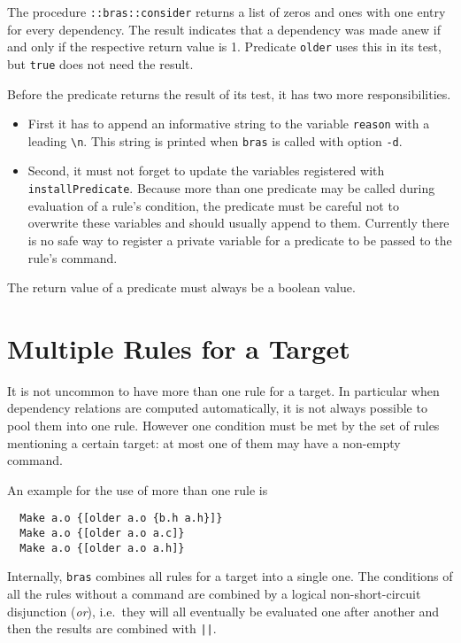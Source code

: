 \documentclass[11pt]{scrartcl}
\newcommand{\bras}{\texttt{bras}}
\begin{document}
The procedure \texttt{::bras::consider} returns a list of zeros and
ones with one entry for every dependency. The result indicates that a
dependency was made anew if and only if the respective return value is
1. Predicate \texttt{older} uses this in its test, but \texttt{true}
does not need the result.

Before the predicate returns the result of its test, it has two more
responsibilities. 
\begin{itemize}
\item First it has to append an informative string to the variable
  \texttt{reason} with a leading \verb|\n|. This string is printed
  when \bras{} is called with option \texttt{-d}. 
\item Second, it must not forget to update the variables registered
  with \texttt{installPredicate}. Because more than one predicate may
  be called during evaluation of a rule's condition, the predicate
  must be careful not to overwrite these variables and should usually
  append to them. Currently there is no safe way to register a private
  variable for a predicate to be passed to the rule's command.
\end{itemize}

The return value of a predicate must always be a boolean value.

\section{Multiple Rules for a Target}
\label{secMultipleRules}

It is not uncommon to have more than one rule for a target. In
particular when dependency relations are computed automatically, it is
not always possible to pool them into one rule. However one condition
must be met by the set of rules mentioning a certain target: at most
one of them may have a non-empty command.

An example for the use of more than one rule is
\begin{verbatim}
  Make a.o {[older a.o {b.h a.h}]} 
  Make a.o {[older a.o a.c]}
  Make a.o {[older a.o a.h]}
\end{verbatim}

Internally, \bras{} combines all rules for a target into a single one.
The conditions of all the rules without a command are combined by a
logical non-short-circuit disjunction (\textit{or}), i.e.\ they will
all eventually be evaluated one after another and then the results are
combined with \texttt{||}.
\end{document}
